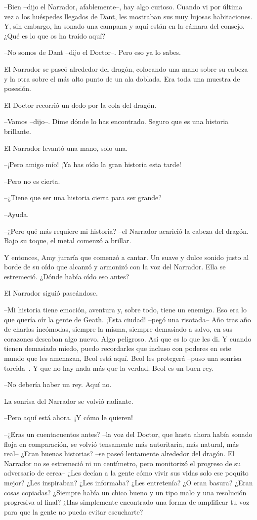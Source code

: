 {--Bien --dijo el Narrador, afablemente--, hay algo curioso. Cuando vi
	por última vez a los huéspedes llegados de Dant, les mostraban sus muy
	lujosas habitaciones. Y, sin embargo, ha sonado una campana y aquí están
en la cámara del consejo. ¿Qué es lo que os ha traído aquí?}

{--No somos de Dant --dijo el Doctor--. Pero eso ya lo sabes.}

{El Narrador se paseó alrededor del dragón, colocando una mano sobre su
	cabeza y la otra sobre el más alto punto de un ala doblada. Era toda una
muestra de posesión.}

{El Doctor recorrió un dedo por la cola del dragón.}

{--Vamos --dijo--. Dime dónde lo has encontrado. Seguro que es una
historia brillante.}

{El Narrador levantó una mano, solo una.}

{--¡Pero amigo mío! ¡Ya has oído la gran historia esta tarde!}

{--Pero no es cierta.}

{--¿Tiene que ser una historia cierta para ser grande?}

{--Ayuda.}

{--¿Pero qué más requiere mi historia? --el Narrador acarició la
cabeza del dragón. Bajo su toque, el metal comenzó a brillar.}

{Y entonces, Amy juraría que comenzó a cantar. Un suave y dulce sonido
	justo al borde de su oído que alcanzó y armonizó con la voz del
Narrador. Ella se estremeció. ¿Dónde había oído eso antes?}

{El Narrador siguió paseándose.}

{--Mi historia tiene emoción, aventura y, sobre todo, tiene un
	enemigo. Eso era lo que quería oír la gente de Geath. ¡Esta ciudad!
	--pegó una risotada-- Año tras año de charlas incómodas, siempre la
	misma, siempre demasiado a salvo, en sus corazones deseaban algo nuevo.
	Algo peligroso. Así que es lo que les di. Y cuando tienen demasiado
	miedo, puedo recordarles que incluso con poderes en este mundo que les
	amenazan, Beol está aquí. Beol les protegerá --puso una sonrisa
torcida--. Y que no hay nada más que la verdad. Beol es un buen rey.}

{--No debería haber un rey. Aquí no.}

{La sonrisa del Narrador se volvió radiante.}

{--Pero aquí está ahora. ¡Y cómo le quieren!}

{--¿Eras un cuentacuentos antes? --la voz del Doctor, que hasta ahora
	había sonado floja en comparación, se volvió tensamente más autoritaria,
	más natural, más real-- ¿Eran buenas historias? --se paseó lentamente
	alrededor del dragón. El Narrador no se estremeció ni un centímetro,
	pero monitorizó el progreso de su adversario de cerca-- ¿Les decían a la
	gente cómo vivir sus vidas solo ese poquito mejor? ¿Les inspiraban? ¿Les
	informaba? ¿Les entretenía? ¿O eran basura? ¿Eran cosas copiadas?
	¿Siempre había un chico bueno y un tipo malo y una resolución progresiva
	al final? ¿Has simplemente encontrado una forma de amplificar tu voz
para que la gente no pueda evitar escucharte?}

